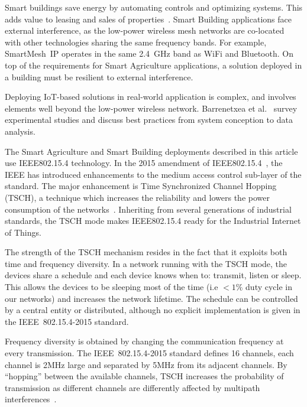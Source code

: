 \documentclass{elsarticle}
\newcommand{\smip}                {SmartMesh~IP\xspace}
\newcommand{\building}            {Smart Building\xspace}
\newcommand{\agri}                {Smart Agriculture\xspace}
\begin{document}

Smart buildings save energy by automating controls and optimizing systems.
This adds value to leasing and sales of properties~\cite{king17smart}.
\building applications face external interference, as the low-power wireless mesh networks are co-located with other technologies sharing the same frequency bands.
For example, \smip operates in the same 2.4~GHz band as WiFi and Bluetooth.
On top of the requirements for \agri applications, a solution deployed in a building must be resilient to external interference.


Deploying IoT-based solutions in real-world application is complex, and involves elements well beyond the low-power wireless network.
Barrenetxea et al.~\cite{barrenetxea08hitchhiker} survey experimental studies and discuss best practices from system conception to data analysis.


The \agri and \building deployments described in this article use IEEE802.15.4 technology.
In the 2015 amendment of IEEE802.15.4~\cite{std_ieee802154_2015}, the IEEE has introduced enhancements to the medium access control sub-layer of the standard.
The major enhancement is Time Synchronized Channel Hopping (TSCH), a technique which increases the reliability and lowers the power consumption of the networks~\cite{deguglielmo16ieee}.
Inheriting from several generations of industrial standards, the TSCH mode makes IEEE802.15.4 ready for the Industrial Internet of Things.


The strength of the TSCH mechanism resides in the fact that it exploits both time and frequency diversity.
In a network running with the TSCH mode, the devices share a schedule and each device knows when to: transmit, listen or sleep.
This allows the devices to be sleeping most of the time (i.e $<1\%$ duty cycle in our networks) and increases the network lifetime.
The schedule can be controlled by a central entity or distributed, although no explicit implementation is given in the IEEE~802.15.4-2015 standard.

Frequency diversity is obtained by changing the communication frequency at every transmission.
The IEEE~802.15.4-2015 standard defines 16 channels, each channel is 2MHz large and separated by 5MHz from its adjacent channels.
By ``hopping'' between the available channels, TSCH increases the probability of transmission as different channels are differently affected by multipath interferences~\cite{watteyne09reliability}.
\end{document}
